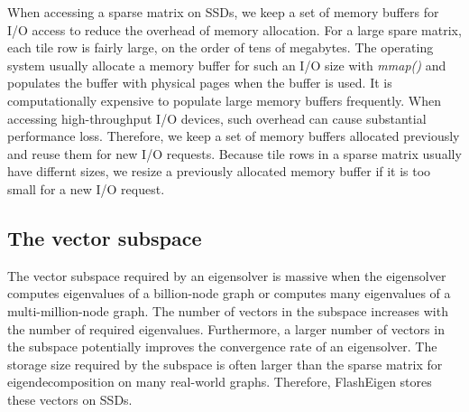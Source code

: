 When accessing a sparse matrix on SSDs, we keep a set of memory buffers for
I/O access to reduce the overhead of memory allocation.
For a large spare matrix, each tile row is fairly large, on the order
of tens of megabytes. The operating system usually allocate a memory buffer
for such an I/O size with \textit{mmap()} and populates the buffer with physical
pages when the buffer is used. It is computationally expensive to populate
large memory buffers frequently. When accessing high-throughput I/O devices,
such overhead can cause substantial performance loss. Therefore, we keep a set
of memory buffers allocated previously and reuse them for new I/O requests.
Because tile rows in a sparse matrix usually have differnt sizes, we resize
a previously allocated memory buffer if it is too small for a new I/O request.

\subsection{The vector subspace}
The vector subspace required by an eigensolver is massive when the eigensolver
computes eigenvalues of a billion-node graph or computes many eigenvalues
of a multi-million-node graph. The number of vectors in the subspace
increases with the number of required eigenvalues. Furthermore, a larger
number of vectors in the subspace potentially improves the convergence rate
of an eigensolver. The storage size required by the subspace is often larger than
the sparse matrix for eigendecomposition on many real-world graphs. Therefore,
FlashEigen stores these vectors on SSDs.

